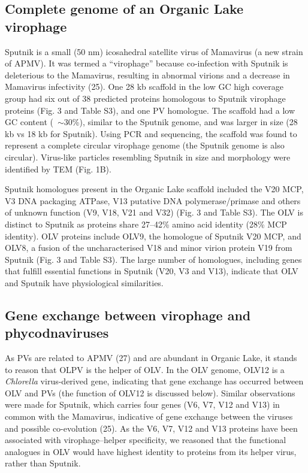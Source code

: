 \subsection{Complete genome of an Organic Lake virophage}
Sputnik is a small (50 nm) icosahedral satellite virus of Mamavirus (a new strain of \ac{APMV}). 
It was termed a ``virophage'' because co-infection with Sputnik is deleterious to the Mamavirus, resulting in abnormal virions and a decrease in Mamavirus infectivity (25). 
One 28 kb scaffold in the low GC high coverage group had six out of 38 predicted proteins homologous to Sputnik virophage proteins (Fig. 3 and Table S3), and one \ac{PV} homologue. 
The scaffold had a low GC content (~$\sim$30\%), similar to the Sputnik genome, and was larger in size (28 kb vs 18 kb for Sputnik). 
Using \ac{PCR} and sequencing, the scaffold was found to represent a complete circular virophage genome (the Sputnik genome is also circular). Virus-like particles resembling Sputnik in size and morphology were identified by \ac{TEM} (Fig. 1B).

Sputnik homologues present in the Organic Lake scaffold included the V20 \ac{MCP}, V3 \textsc{DNA} packaging \textsc{ATP}ase, V13 putative \textsc{DNA} polymerase/primase and others of unknown function (V9, V18, V21 and V32) (Fig. 3 and Table S3). 
The \ac{OLV} is distinct to Sputnik as proteins share 27--42\% amino acid identity (28\% \ac{MCP} identity). 
\ac{OLV} proteins include OLV9, the homologue of Sputnik V20 \ac{MCP}, and OLV8, a fusion of the uncharacterised V18 and minor virion protein V19 from Sputnik (Fig. 3 and Table S3). 
The large number of homologues, including genes that fulfill essential functions in Sputnik (V20, V3 and V13), indicate that \ac{OLV} and Sputnik have physiological similarities. 

\subsection{Gene exchange between virophage and phycodnaviruses}

As \acp{PV} are related to \ac{APMV} (27) and are abundant in Organic Lake, it stands to reason that \ac{OLPV} is the helper of \ac{OLV}. 
In the \ac{OLV} genome, OLV12 is a \emph{Chlorella} virus-derived gene, indicating that gene exchange has occurred between \ac{OLV} and \acp{PV} (the function of OLV12 is discussed below). %
Similar observations were made for Sputnik, which carries four genes (V6, V7, V12 and V13) in common with the Mamavirus, indicative of gene exchange between the viruses and possible co-evolution (25). 
As the V6, V7, V12 and V13 proteins have been associated with virophage--helper specificity, we reasoned that the functional analogues in \ac{OLV} would have highest identity to proteins from its helper virus, rather than Sputnik. 

